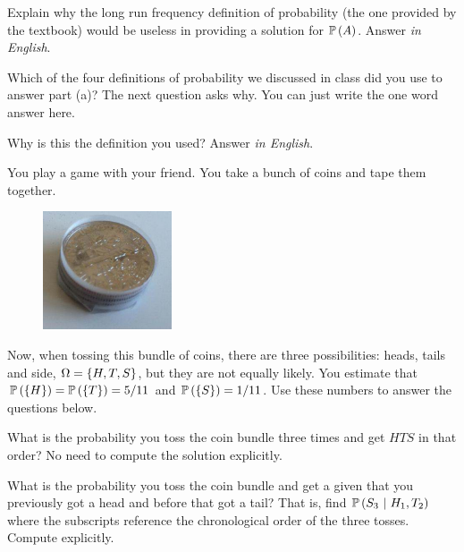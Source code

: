 \documentclass[12pt]{article}
\begin{document}
 Explain why the long run frequency definition of probability (the one provided by the textbook) would be useless in providing a solution for $\mathbb{P}\left(A\right)$. Answer \textit{in English}. 

 Which of the four definitions of probability we discussed in class did you use to answer part (a)? The next question asks why. You can just write the one word answer here. 

  Why is this the definition you used? Answer \textit{in English}. 



\eenum
\pagebreak

\problem You play a game with your friend. You take a bunch of coins and tape them together. 

\begin{figure}[htp]
\centering
\includegraphics[width=1.5in]{coins.png}
\end{figure}
\FloatBarrier


\noindent Now, when tossing this bundle of coins, there are three possibilities: heads, tails and side, $\Omega = \left\{H, T, S\right\}$, but they are not equally likely. You estimate that $\mathbb{P}\left(\left\{H\right\}\right) = \mathbb{P}\left(\left\{T\right\}\right) = 5/11$ and $\mathbb{P}\left(\left\{S\right\}\right) = 1/11$. Use these numbers to answer the questions below.

\benum

 What is the probability you toss the coin bundle three times and get $HTS$ in that order? No need to compute the solution explicitly.

 What is the probability you toss the coin bundle and get a  given that you previously got a head and before that got a tail? That is, find $\mathbb{P}\left(S_3~|~H_1, T_2\right)$ where the subscripts reference the chronological order of the three tosses. Compute explicitly.
\end{document}
